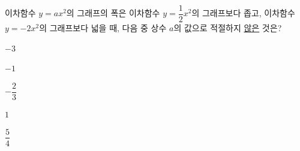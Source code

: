 이차함수 $y=ax^2$의 그래프의 폭은 이차함수 $y=\dfrac{1}{2}x^2$의 그래프보다 좁고, 이차함수 $y=-2x^2$의 그래프보다 넓을 때, 다음 중 상수 $a$의 값으로 적절하지 \underline{않은} 것은?
\begin{choices32}{\rule[-3ex]{0pt}{8ex}$-3$}{\rule[-3ex]{0pt}{8ex}$-1$}{\rule[-3ex]{0pt}{8ex}$-\dfrac{2}{3}$}{\rule[-3ex]{0pt}{8ex}$1$}{\rule[-3ex]{0pt}{8ex}$\dfrac{5}{4}$}\end{choices32}
